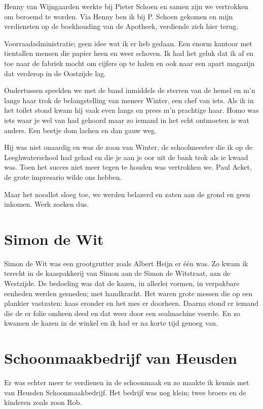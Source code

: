 \documentclass[10pt,twoside,openright]{memoir}
\begin{document}
Henny van Wijngaarden werkte bij Pieter Schoen en samen zijn we vertrokken om beroemd te worden. Via Henny ben ik bij P. Schoen gekomen en mijn verdiensten op de boekhouding van de Apotheek, verdiende zich hier terug. 

Voorraadadministratie; geen idee wat ik er heb gedaan. Een enorm kantoor met tientallen mensen die papier heen en weer schoven. Ik had het geluk dat ik af en toe naar de fabriek mocht om cijfers op te halen en ook naar een apart magazijn dat verderop in de Oostzijde lag. 

Ondertussen speelden we met de band inmiddels de sterren van de hemel en m’n lange haar trok de belangstelling van meneer Winter, een chef van iets. Als ik in het toilet stond kwam hij vaak even langs en prees m’n prachtige haar. Homo was iets waar je wel van had gehoord maar zo iemand in het echt ontmoeten is wat anders. Een beetje dom lachen en dan gauw weg. 

Hij was niet onaardig en was de zoon van Winter, de schoolmeester die ik op de Leeghwaterschool had gehad en die je aan je oor uit de bank trok als ie kwaad was. Toen het succes niet meer tegen te houden was vertrokken we. Paul Acket, de grote impresario wilde ons hebben.

Maar het noodlot sloeg toe, we werden belazerd en zaten aan de grond en geen inkomen. Werk zoeken dus.

\chapter{Simon de Wit} %
\label{cha:wit}

Simon de Wit was een grootgrutter zoals Albert Heijn er één was. Zo kwam ik terecht in de kaaspakkerij van Simon aan de Simon de Witstraat, aan de Westzijde. De bedoeling was dat de kazen, in allerlei vormen, in verpakbare eenheden werden gesneden; met handkracht. Het waren grote messen die op een plankier vastzaten: kaas eronder en het mes er doorheen. Daarna stond er iemand die de er folie omheen deed en dat weer door een sealmachine voerde. En zo kwamen de kazen in de winkel en ik had er na korte tijd genoeg van.

\chapter{Schoonmaakbedrijf van Heusden} %
\label{cha:schoonmaakbedrijf}

Er was echter meer te verdienen in de schoonmaak en zo maakte ik kennis met van Heusden Schoonmaakbedrijf. Het bedrijf was nog klein; twee broers en de kinderen zoals zoon Rob. 
\end{document}
